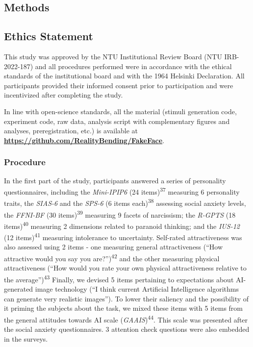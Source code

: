 \documentclass[
  man,floatsintext]{apa6}
\begin{document}
\hypertarget{methods}{%
\subsection{Methods}\label{methods}}

\hypertarget{ethics-statement}{%
\subsection{Ethics Statement}\label{ethics-statement}}

This study was approved by the NTU Institutional Review Board (NTU IRB-2022-187) and all procedures performed were in accordance with the ethical standards of the institutional board and with the 1964 Helsinki Declaration. All participants provided their informed consent prior to participation and were incentivized after completing the study.

In line with open-science standards, all the material (stimuli generation code, experiment code, raw data, analysis script with complementary figures and analyses, preregistration, etc.) is available at \href{https://github.com/RealityBending/FakeFace}{\textbf{https://github.com/RealityBending/FakeFace}}.

\hypertarget{procedure}{%
\subsubsection{Procedure}\label{procedure}}

In the first part of the study, participants answered a series of personality questionnaires, including the \emph{Mini-IPIP6}
(24 items)\textsuperscript{37}
measuring 6 personality traits, the \emph{SIAS-6} and the \emph{SPS-6}
(6 items each)\textsuperscript{38}
assessing social anxiety levels, the \emph{FFNI-BF}
(30 items)\textsuperscript{39}
measuring 9 facets of narcissism; the \emph{R-GPTS}
(18 items)\textsuperscript{40}
measuring 2 dimensions related to paranoid thinking; and the \emph{IUS-12}
(12 items)\textsuperscript{41}
measuring intolerance to uncertainty. Self-rated attractiveness was also assessed using 2 items - one measuring general attractiveness
(``How attractive would you say you are?'')\textsuperscript{42}
and the other measuring physical attractiveness
(``How would you rate your own physical attractiveness relative to the average'')\textsuperscript{43}
Finally, we devised 5 items pertaining to expectations about AI-generated image technology (``I think current Artificial Intelligence algorithms can generate very realistic images''). To lower their saliency and the possibility of it priming the subjects about the task, we mixed these items with 5 items from the general attitudes towards AI scale
(\emph{GAAIS})\textsuperscript{44}.
This scale was presented after the social anxiety questionnaires. 3 attention check questions were also embedded in the surveys.
\end{document}

